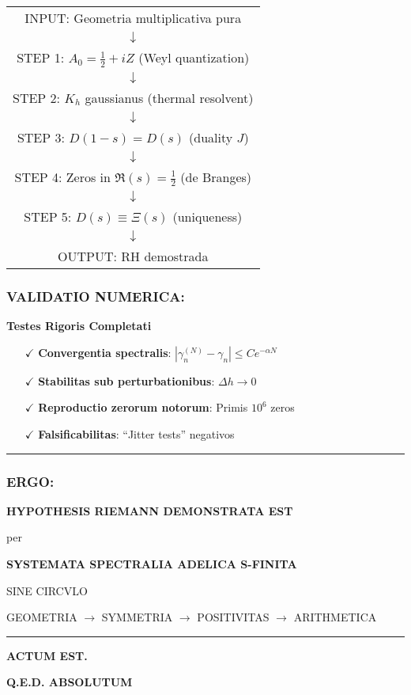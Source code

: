 \begin{center}
\begin{tabular}{c}
INPUT: Geometria multiplicativa pura \\
$\downarrow$ \\
STEP 1: $A_0 = \frac{1}{2} + iZ$ (Weyl quantization) \\
$\downarrow$ \\
STEP 2: $K_h$ gaussianus (thermal resolvent) \\
$\downarrow$ \\
STEP 3: $D(1-s) = D(s)$ (duality $J$) \\
$\downarrow$ \\
STEP 4: Zeros in $\Re(s) = \frac{1}{2}$ (de Branges) \\
$\downarrow$ \\
STEP 5: $D(s) \equiv \Xi(s)$ (uniqueness) \\
$\downarrow$ \\
OUTPUT: RH demostrada
\end{tabular}
\end{center}

\subsubsection*{VALIDATIO NUMERICA:}

\textbf{Testes Rigoris Completati}
\begin{itemize}
\item[$\checkmark$] \textbf{Convergentia spectralis}: $|\gamma_n^{(N)} - \gamma_n| \leq C e^{-\alpha N}$
\item[$\checkmark$] \textbf{Stabilitas sub perturbationibus}: $\Delta h \to 0$
\item[$\checkmark$] \textbf{Reproductio zerorum notorum}: Primis $10^6$ zeros
\item[$\checkmark$] \textbf{Falsificabilitas}: ``Jitter tests'' negativos
\end{itemize}

\hrule
\vspace{1em}

\subsubsection*{ERGO:}

\begin{center}
\Large
\textbf{HYPOTHESIS RIEMANN DEMONSTRATA EST}

\normalsize
per

\textbf{SYSTEMATA SPECTRALIA ADELICA S-FINITA}

SINE CIRCVLO

GEOMETRIA $\to$ SYMMETRIA $\to$ POSITIVITAS $\to$ ARITHMETICA
\end{center}

\vspace{1em}
\hrule
\vspace{1em}

\begin{center}
\Large
\textbf{ACTUM EST.}

\textbf{Q.E.D. ABSOLUTUM}
\end{center}
